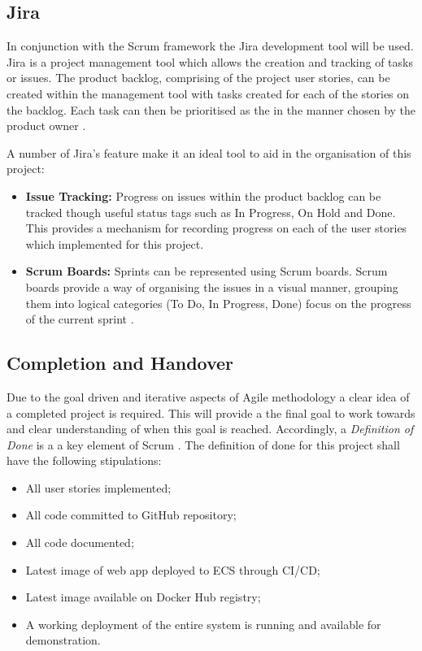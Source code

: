 	\subsection{Jira}
	In conjunction with the Scrum framework the Jira development tool will be used. Jira is a project management tool which allows the creation and tracking of tasks or issues. The product backlog, comprising of the project user stories, can be created within the management tool with tasks created for each of the stories on the backlog. Each task can then be prioritised as the in the manner chosen by the product owner \citep{jira}.
	
	A number of Jira's feature make it an ideal tool to aid in the organisation of this project:
	\begin{itemize}
		\item \textbf{Issue Tracking:} Progress on issues within the product backlog can be tracked though useful status tags such as In Progress, On Hold and Done. This provides a mechanism for recording progress on each of the user stories which implemented for this project. 
		\item \textbf{Scrum Boards: } Sprints can be represented using Scrum boards. Scrum boards provide a way of organising the issues in a visual manner, grouping them into logical categories (To Do, In Progress, Done) focus on the progress of the current sprint \cite{scruminc}.
	\end{itemize}
	
	\subsection{Completion and Handover}
	Due to the goal driven and iterative aspects of Agile methodology a clear idea of a completed project is required. This will provide a the final goal to work towards and clear understanding of when this goal is reached. Accordingly, a \textit{Definition of Done} is a a key element of Scrum \citep{panchal}. The definition of done for this project shall have the following stipulations:
	\begin{itemize}
		\item All user stories implemented;
		\item All code committed to GitHub repository;
		\item All code documented;
		\item Latest image of web app deployed to ECS through CI/CD;
		\item Latest image available on Docker Hub registry;
		\item A working deployment of the entire system is running and available for demonstration.
	\end{itemize}
	 
